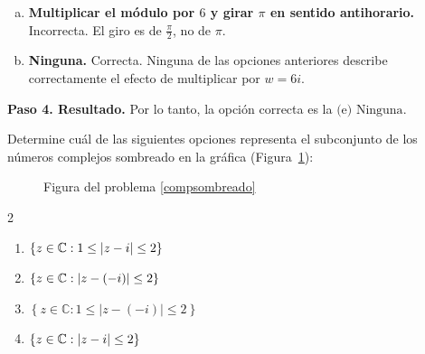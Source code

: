 \begin{prob}
\begin{myproof}
\begin{enumerate}[(a)]
\item \textbf{Multiplicar el módulo por $6$ y girar $\pi$ en sentido antihorario.}  
Incorrecta. El giro es de $\frac{\pi}{2}$, no de $\pi$.

\item \textbf{Ninguna.}  
Correcta. Ninguna de las opciones anteriores describe correctamente el efecto de multiplicar por $w=6i$.
\end{enumerate}

\textbf{Paso 4. Resultado.} Por lo tanto, la opción correcta es la $\boxed{\text{(e) Ninguna}}$.
\end{myproof}

\end{prob}



\begin{prob}\label{compsombreado}
Determine cuál de las siguientes opciones representa el subconjunto de los números complejos sombreado en la gráfica (Figura~\ref{fig:anillo_sombreado}):


\begin{figure}[!htbp]
\centering 		
{}
\caption{Figura del problema \ref{compsombreado}}
\label{fig:anillo_sombreado}
\end{figure} 
\begin{multicols}{2}
\begin{enumerate}[$(a)$]
\item  $\left\lbrace z\in \mathbb{C}: 1\leq\left\vert z-i\right\vert\leq 2 \right\rbrace$
\item  $\left\lbrace z\in \mathbb{C}:  \left\vert z-(-i)\right\vert\leq 2 \right\rbrace$
\item $\left\lbrace z\in\mathbb{C}:1\leq|z-(-i)|\leq 2\right\rbrace$
\item  $\left\lbrace z\in \mathbb{C}:  \left\vert z-i\right\vert\leq 2 \right\rbrace$
\end{enumerate}
\end{multicols}


\end{prob}

